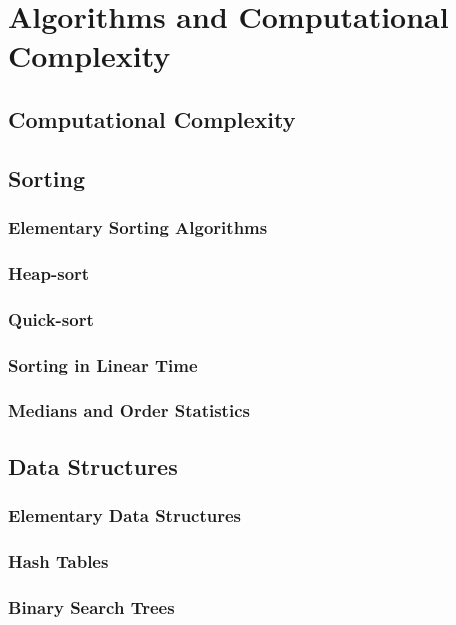 \part{Algorithms and Computational Complexity}
	\chapter{Computational Complexity}

	\chapter{Sorting}
		\section{Elementary Sorting Algorithms}

		\section{Heap-sort}

		\section{Quick-sort}

		\section{Sorting in Linear Time}

		\section{Medians and Order Statistics}

	\chapter{Data Structures}
		\section{Elementary Data Structures}

		\section{Hash Tables}

		\section{Binary Search Trees}

